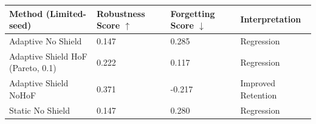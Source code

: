 \begin{tabular}{llll}
\toprule
Method (Limited-seed) & Robustness Score $\uparrow$ & Forgetting Score $\downarrow$ & Interpretation \\
\midrule
Adaptive No Shield & 0.147 & 0.285 & Regression \\
Adaptive Shield HoF (Pareto, 0.1) & 0.222 & 0.117 & Regression \\
Adaptive Shield NoHoF & 0.371 & -0.217 & Improved Retention \\
Static No Shield & 0.147 & 0.280 & Regression \\
\bottomrule
\end{tabular}

